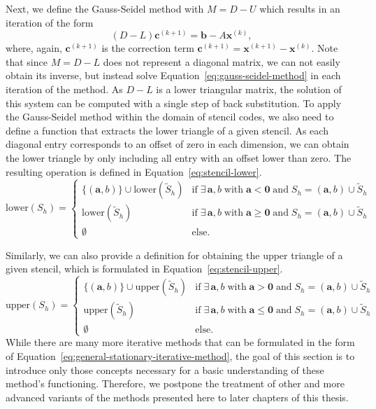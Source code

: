 Next, we define the Gauss-Seidel method with $M = D - U$ which results in an iteration of the form
\begin{equation}
	(D - L) \bm{c}^{(k+1)} = \bm{b} - A \bm{x}^{(k)}, 
	\label{eq:gauss-seidel-method}
\end{equation}
where, again, $\bm{c}^{(k+1)}$ is the correction term $\bm{c}^{(k+1)} = \bm{x}^{(k+1)} - \bm{x}^{(k)}$.
Note that since $M = D - L$ does not represent a diagonal matrix, we can not easily obtain its inverse, but instead solve Equation~\eqref{eq:gauss-seidel-method} in each iteration of the method.
As $D - L$ is a lower triangular matrix, the solution of this system can be computed with a single step of back substitution. 
To apply the Gauss-Seidel method within the domain of stencil codes, we also need to define a function that extracts the lower triangle of a given stencil.
As each diagonal entry corresponds to an offset of zero in each dimension, we can obtain the lower triangle by only including all entry with an offset lower than zero.
The resulting operation is defined in Equation~\eqref{eq:stencil-lower}.
\begin{equation}
	\text{lower}(S_h) = \begin{cases}
		\{(\bm{a}, b) \} \cup \text{lower}(\tilde{S}_h) & \text{if} \; \exists\, \bm a, b \; \text{with} \; \bm a < \bm 0 \; \text{and} \; S_h = (\bm a, b) \cup \tilde{S}_h \\
		\text{lower}(\tilde{S}_h) & \text{if} \; \exists\, \bm a, b \; \text{with} \; \bm a \geq \bm 0 \; \text{and} \; S_h = (\bm a, b) \cup \tilde{S}_h \\
		\emptyset & \text{else}.
	\end{cases}
	\label{eq:stencil-lower}
\end{equation}

Similarly, we can also provide a definition for obtaining the upper triangle of a given stencil, which is formulated in Equation~\eqref{eq:stencil-upper}.
\begin{equation}
	\text{upper}(S_h) = \begin{cases}
		\{(\bm{a}, b) \} \cup \text{upper}(\tilde{S}_h) & \text{if} \; \exists\, \bm a, b \; \text{with} \; \bm a > \bm 0 \; \text{and} \; S_h = (\bm a, b) \cup \tilde{S}_h \\
		\text{upper}(\tilde{S}_h) & \text{if} \; \exists\, \bm a, b \; \text{with} \; \bm a \leq \bm 0 \; \text{and} \; S_h = (\bm a, b) \cup \tilde{S}_h \\
		\emptyset & \text{else}.
	\end{cases}
	\label{eq:stencil-upper}
\end{equation}
While there are many more iterative methods that can be formulated in the form of Equation~\eqref{eq:general-stationary-iterative-method}, the goal of this section is to introduce only those concepts necessary for a basic understanding of these method's functioning.
Therefore, we postpone the treatment of other and more advanced variants of the methods presented here to later chapters of this thesis. 

